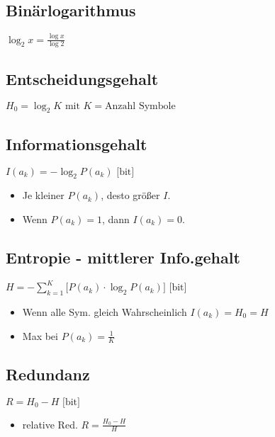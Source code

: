 \begin{multicols}{2}

\subsection*{Binärlogarithmus}
$\displaystyle \log_2{x} = \frac{\log{x}}{\log{2}}$

\subsection*{Entscheidungsgehalt}
$\displaystyle H_0 = \log_2{K} 
	\mbox{ mit } K = \text{Anzahl Symbole}$

\subsection*{Informationsgehalt}
\begin{minipage}{\columnwidth}
$\displaystyle I(a_k) = -\log_2{P(a_k)} \mbox{  [bit]}$
\begin{itemize}
	\setlength{\parskip}{0pt}
	\setlength{\itemsep}{0pt}
	\item Je kleiner $P(a_k)$, desto größer $I$.
	\item Wenn $P(a_k) = 1$, dann $I(a_k) = 0$.
\end{itemize}
\end{minipage}

\subsection*{Entropie - mittlerer Info.gehalt}
\begin{minipage}{\columnwidth}
$\displaystyle H = - \sum_{k=1}^{K} 
	\bigg[ P(a_k) \cdot \log_2{P(a_k)} \bigg] 
	\mbox{  [bit]}$
\begin{itemize}
	\setlength{\parskip}{0pt}
	\setlength{\itemsep}{0pt plus 1pt}
	\item Wenn alle Sym. gleich Wahrscheinlich $I(a_k) = H_0 = H$
	\item Max bei $P(a_k) = \frac{1}{K}$
\end{itemize}
\end{minipage}

\subsection*{Redundanz}
\begin{minipage}{\columnwidth}
$\displaystyle R = H_0 - H \mbox{  [bit]}$
\begin{itemize}
	\setlength{\parskip}{0pt}
	\setlength{\itemsep}{0pt plus 1pt}
	\item relative Red. $\displaystyle R = \frac{H_0 - H}{H}$
\end{itemize}
\end{minipage}


\end{multicols}
